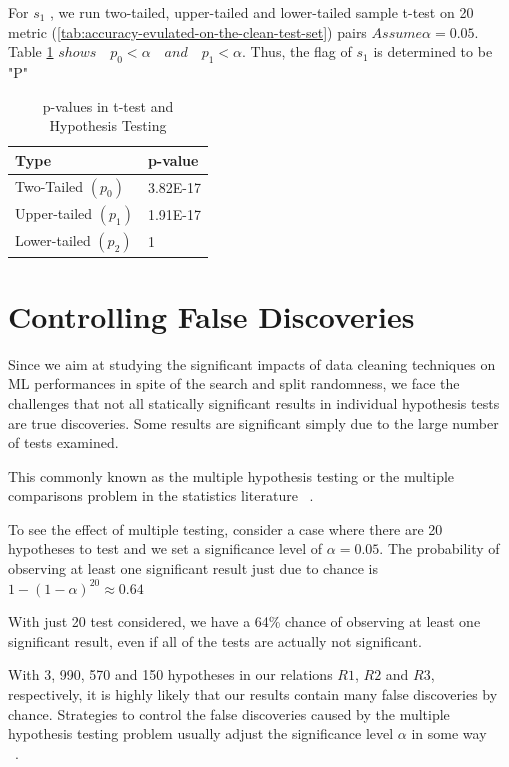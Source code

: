\begin{example}
	For $s_{1}$ , we run two-tailed, upper-tailed and lower-tailed sample t-test on 20 metric (\ref{tab:accuracy-evulated-on-the-clean-test-set}) pairs $Assume \alpha = 0.05$. Table \ref{tab:hypothesis-testing} $shows \quad p_{0} < \alpha \quad and \quad p_{1} < \alpha$. 
	Thus, the flag of $s_{1}$ is determined to be "P"
\end{example}

\begin{table}[H]
	\centering
	\begin{tabular}{|l|l|}
		\hline
		Type & p-value \\ \hline
		Two-Tailed $(p_{0})$& 3.82E-17 \\ \hline
		Upper-tailed $(p_{1})$ & 1.91E-17 \\ \hline
		Lower-tailed $(p_{2})$ & 1  \\ \hline
	\end{tabular}
	\caption{p-values in t-test and Hypothesis Testing}
	\label{tab:hypothesis-testing}
\end{table}

\section{Controlling False Discoveries}
Since we aim at studying the significant impacts of data cleaning techniques on ML performances in spite of the search and split randomness, we face the challenges that not all statically significant results in individual hypothesis tests are true discoveries. 
Some results are significant simply due to the large number of tests examined. 

This commonly known as the multiple hypothesis testing or the multiple comparisons problem in the statistics literature ~\cite{Rupert2012}.

To see the effect of multiple testing, consider a case where there are 20 hypotheses to test and we set a significance level of $\alpha = 0.05$. The probability of observing at least one significant result just due to chance is $ 1 - (1 - \alpha)^{20} \approx 0.64$

With just 20 test considered, we have a 64\% chance of observing at least one significant result, even if all of the tests are actually not significant.

With 3, 990, 570 and 150 hypotheses in our relations $R1$, $R2$ and $R3$, respectively, it is highly likely that our results contain many false discoveries by chance. Strategies to control the false discoveries caused by the multiple hypothesis testing problem usually adjust the significance level $\alpha$ in some way ~\cite{Rupert2012} ~\cite{Benjamini1995}.

